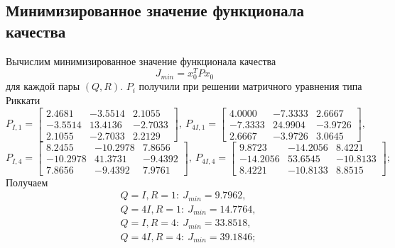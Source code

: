 \documentclass[a4paper, 12pt]{article}
\begin{document}
    \subsection{Минимизированное значение функционала качества}
    Вычислим минимизированное значение функционала качества
    $$
    J_{min}=x_0^TPx_0
    $$
    для каждой пары $\left( Q,R \right)$. $P_i$ получили при решении
    матричного уравнения типа Риккати
    $$
    P_{I,1}=\begin{bmatrix}
        2.4681   &-3.5514    &2.1055\\
        -3.5514   &13.4136   &-2.7033\\
         2.1055   &-2.7033    &2.2129   
    \end{bmatrix},\ P_{4I,1}=\begin{bmatrix}
        4.0000   &-7.3333   & 2.6667\\
   -7.3333   &24.9904   &-3.9726\\
    2.6667   &-3.9726    &3.0645
    \end{bmatrix},
    $$
    $$
    P_{I,4}=\begin{bmatrix}
        8.2455  &-10.2978    &7.8656\\
  -10.2978   &41.3731   &-9.4392\\
    7.8656   &-9.4392    &7.9761   
    \end{bmatrix},\ P_{4I,4}=\begin{bmatrix}
        9.8723  &-14.2056    &8.4221\\
  -14.2056   &53.6545  &-10.8133\\
    8.4221  &-10.8133    &8.8515
    \end{bmatrix};
    $$
    Получаем
    \begin{align}
        &Q=I,R=1:\ J_{min}=9.7962, \label{eq:jminI1}\\
        &Q=4I,R=1:\ J_{min}=14.7764, \label{eq:jmin4I1}\\
        &Q=I,R=4:\ J_{min}=33.8518, \label{eq:jminI4}\\
        &Q=4I,R=4:\ J_{min}=39.1846; \label{eq:jmin4I4}
    \end{align}
\end{document}
